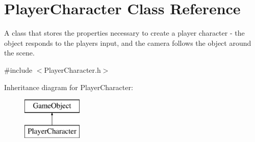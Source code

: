 \hypertarget{class_player_character}{}\section{Player\+Character Class Reference}
\label{class_player_character}


A class that stores the properties necessary to create a player character -\/ the object responds to the player\textquotesingle{}s input, and the camera follows the object around the scene.  




{\ttfamily \#include $<$Player\+Character.\+h$>$}

Inheritance diagram for Player\+Character\+:\begin{figure}[H]
\begin{center}
\leavevmode
\includegraphics[height=2.000000cm]{class_player_character}
\end{center}
\end{figure}

